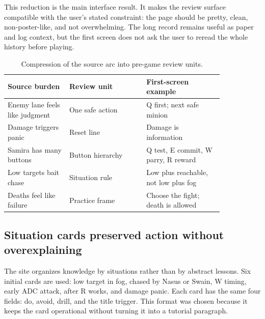 \documentclass[12pt,letterpaper]{article}
\begin{document}
This reduction is the main interface result. It makes the review surface compatible with the user's stated constraint: the page should be pretty, clean, non-poster-like, and not overwhelming. The long record remains useful as paper and log context, but the first screen does not ask the user to reread the whole history before playing.

\begin{table}[H]
\centering
\caption{Compression of the source arc into pre-game review units.}
{\small
\setlength{\tabcolsep}{5pt}
\begin{tabular}{p{0.24\linewidth}p{0.30\linewidth}p{0.30\linewidth}}
\toprule
Source burden & Review unit & First-screen example \\
\midrule
Enemy lane feels like judgment & One safe action & Q first; next safe minion \\
Damage triggers panic & Reset line & Damage is information \\
Samira has many buttons & Button hierarchy & Q test, E commit, W parry, R reward \\
Low targets bait chase & Situation rule & Low plus reachable, not low plus fog \\
Deaths feel like failure & Practice frame & Choose the fight; death is allowed \\
\bottomrule
\end{tabular}
}
\end{table}

\subsection{Situation cards preserved action without overexplaining}

The site organizes knowledge by situations rather than by abstract lessons. Six initial cards are used: low target in fog, chased by Nasus or Swain, W timing, early ADC attack, after R works, and damage panic. Each card has the same four fields: do, avoid, drill, and the title trigger. This format was chosen because it keeps the card operational without turning it into a tutorial paragraph.
\end{document}
